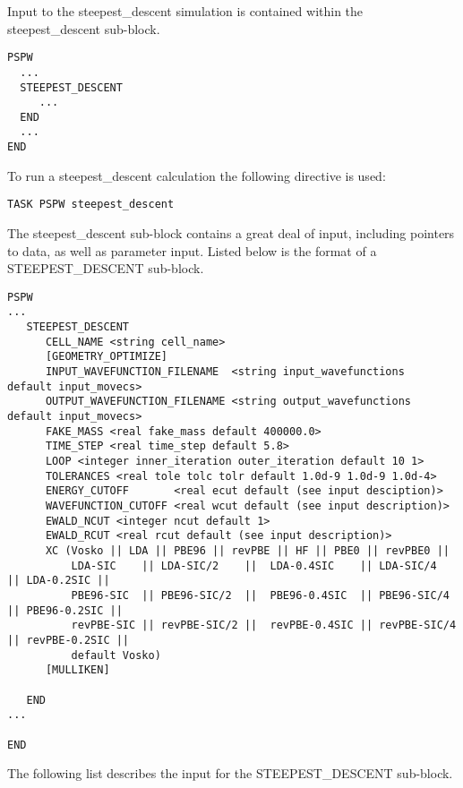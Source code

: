 Input to the steepest\_descent simulation is contained
within the steepest\_descent sub-block.
\begin{verbatim}
PSPW
  ...
  STEEPEST_DESCENT
     ...
  END
  ...
END
\end{verbatim}
To run a steepest\_descent calculation the following directive is used:
\begin{verbatim}
TASK PSPW steepest_descent 
\end{verbatim}
The steepest\_descent sub-block contains a great deal
of input, including pointers to data, as well as
parameter input.  Listed below is the format of a STEEPEST\_DESCENT sub-block.
\begin{verbatim}
PSPW
...
   STEEPEST_DESCENT
      CELL_NAME <string cell_name>
      [GEOMETRY_OPTIMIZE]
      INPUT_WAVEFUNCTION_FILENAME  <string input_wavefunctions  default input_movecs>
      OUTPUT_WAVEFUNCTION_FILENAME <string output_wavefunctions default input_movecs>
      FAKE_MASS <real fake_mass default 400000.0>
      TIME_STEP <real time_step default 5.8>
      LOOP <integer inner_iteration outer_iteration default 10 1>
      TOLERANCES <real tole tolc tolr default 1.0d-9 1.0d-9 1.0d-4>
      ENERGY_CUTOFF       <real ecut default (see input desciption)>
      WAVEFUNCTION_CUTOFF <real wcut default (see input description)>
      EWALD_NCUT <integer ncut default 1>
      EWALD_RCUT <real rcut default (see input description)>
      XC (Vosko || LDA || PBE96 || revPBE || HF || PBE0 || revPBE0 || 
          LDA-SIC    || LDA-SIC/2    ||  LDA-0.4SIC    || LDA-SIC/4    || LDA-0.2SIC ||
          PBE96-SIC  || PBE96-SIC/2  ||  PBE96-0.4SIC  || PBE96-SIC/4  || PBE96-0.2SIC ||
          revPBE-SIC || revPBE-SIC/2 ||  revPBE-0.4SIC || revPBE-SIC/4 || revPBE-0.2SIC ||
          default Vosko)
      [MULLIKEN]

   END
...

END
\end{verbatim}
The following list describes the input for the STEEPEST\_DESCENT
sub-block.
